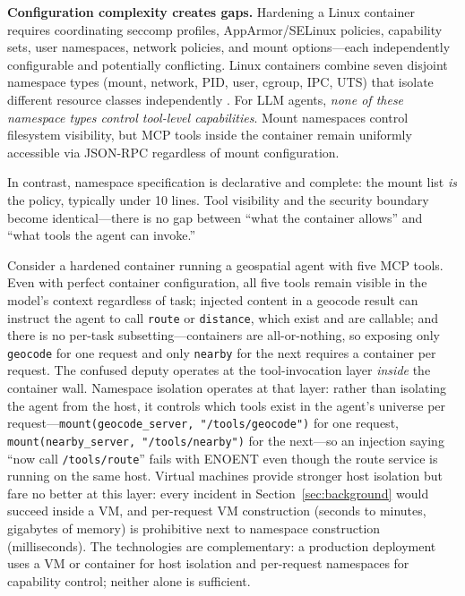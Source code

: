 \documentclass{article}
\begin{document}
\textbf{Configuration complexity creates gaps.} Hardening a Linux container requires coordinating seccomp profiles, AppArmor/SELinux policies, capability sets, user namespaces, network policies, and mount options---each independently configurable and potentially conflicting. Linux containers combine seven disjoint namespace types (mount, network, PID, user, cgroup, IPC, UTS) that isolate different resource classes independently \cite{nist800190}. For LLM agents, \textit{none of these namespace types control tool-level capabilities}. Mount namespaces control filesystem visibility, but MCP tools inside the container remain uniformly accessible via JSON-RPC regardless of mount configuration.

In contrast, namespace specification is declarative and complete: the mount list \textit{is} the policy, typically under 10 lines. Tool visibility and the security boundary become identical---there is no gap between ``what the container allows'' and ``what tools the agent can invoke.''

Consider a hardened container running a geospatial agent with five MCP tools. Even with perfect container configuration, all five tools remain visible in the model's context regardless of task; injected content in a geocode result can instruct the agent to call \texttt{route} or \texttt{distance}, which exist and are callable; and there is no per-task subsetting---containers are all-or-nothing, so exposing only \texttt{geocode} for one request and only \texttt{nearby} for the next requires a container per request. The confused deputy operates at the tool-invocation layer \textit{inside} the container wall. Namespace isolation operates at that layer: rather than isolating the agent from the host, it controls which tools exist in the agent's universe per request---\texttt{mount(geocode\_server, "/tools/geocode")} for one request, \texttt{mount(nearby\_server, "/tools/nearby")} for the next---so an injection saying ``now call \texttt{/tools/route}'' fails with ENOENT even though the route service is running on the same host. Virtual machines provide stronger host isolation but fare no better at this layer: every incident in Section~\ref{sec:background} would succeed inside a VM, and per-request VM construction (seconds to minutes, gigabytes of memory) is prohibitive next to namespace construction (milliseconds). The technologies are complementary: a production deployment uses a VM or container for host isolation and per-request namespaces for capability control; neither alone is sufficient.
\end{document}
